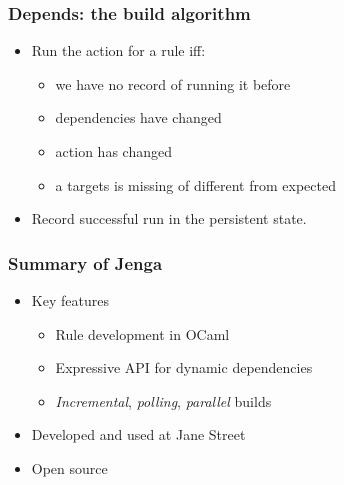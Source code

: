 \documentclass{beamer}
\begin{document}
% 
% 



\begin{frame}[fragile]
\frametitle{Depends: the build algorithm}
\begin{itemize}
\item Run the action for a rule iff:
\begin{itemize}
\item we have no record of running it before
\item dependencies have changed
\item action has changed
\item a targets is missing of different from expected
\end{itemize}
\item Record successful run in the persistent state.
\end{itemize}
\end{frame}




\begin{frame}[fragile]
\frametitle{Summary of Jenga}
\begin{itemize}
\item Key features
\begin{itemize}
\item Rule development in OCaml
\item Expressive API for dynamic dependencies
\item {\em Incremental}, {\em polling}, {\em parallel}\/ builds
\end{itemize}
\item Developed and used at Jane Street
\item Open source
\begin{center}
\end{center}
\vskip12pt
\end{itemize}
\end{frame}
\end{document}
